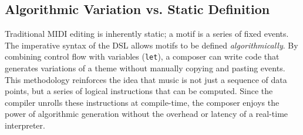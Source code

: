 \subsection{Algorithmic Variation vs. Static Definition}

Traditional MIDI editing is inherently static; a motif is a series of fixed events.
The imperative syntax of the DSL allows motifs to be defined \textit{algorithmically}.
By combining control flow with variables (\texttt{let}), a composer can write code that generates variations
of a theme without manually copying and pasting events.
This methodology reinforces the idea that music is not just a sequence of data points, but a series of
logical instructions that can be computed.
Since the compiler unrolls these instructions at compile-time, the composer enjoys the power of algorithmic
generation without the overhead or latency of a real-time interpreter.
